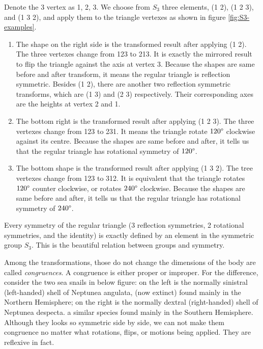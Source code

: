 \documentclass[b5paper]{article}
\begin{document}
Denote the 3 vertex as 1, 2, 3. We choose from $S_3$ three elements, (1 2), (1 2 3), and (1 3 2), and apply them to the triangle vertexes as shown in figure \ref{fig:S3-examples}.

\begin{enumerate}
\item The shape on the right side is the transformed result after applying (1 2). The three vertexes change from 123 to 213. It is exactly the mirrored result to flip the triangle against the axis at vertex 3. Because the shapes are same before and after transform, it means the regular triangle is reflection symmetric. Besides (1 2), there are another two reflection symmetric transforms, which are (1 3) and (2 3) respectively. Their corresponding axes are the heights at vertex 2 and 1.

\item The bottom right is the transformed result after applying (1 2 3). The three vertexes change from 123 to 231. It means the triangle rotate $120\degree$ clockwise against its centre. Because the shapes are same before and after, it tells us that the regular triangle has rotational symmetry of $120\degree$.

\item The bottom shape is the transformed result after applying (1 3 2). The tree vertexes change from 123 to 312. It is equivalent that the triangle rotates $120\degree$ counter clockwise, or rotates $240\degree$ clockwise. Because the shapes are same before and after, it tells us that the regular triangle has rotational symmetry of $240\degree$.

\end{enumerate}

Every symmetry of the regular triangle (3 reflection symmetries, 2 rotational symmetries, and the identity) is exactly defined by an element in the symmetric group $S_3$. This is the beautiful relation between groups and symmetry.

Among the transformations, those do not change the dimensions of the body are called {\em congruences}. A congruence is either proper or improper. For the difference, consider the two sea snails in below figure: on the left is the normally sinistral (left-handed) shell of Neptunea angulata, (now extinct) found mainly in the Northern Hemisphere; on the right is the normally dextral (right-handed) shell of Neptunea despecta. a similar species found mainly in the Southern Hemisphere. Although they looks so symmetric side by side, we can not make them congruence no matter what rotations, flips, or motions being applied. They are reflexive in fact.
\end{document}
